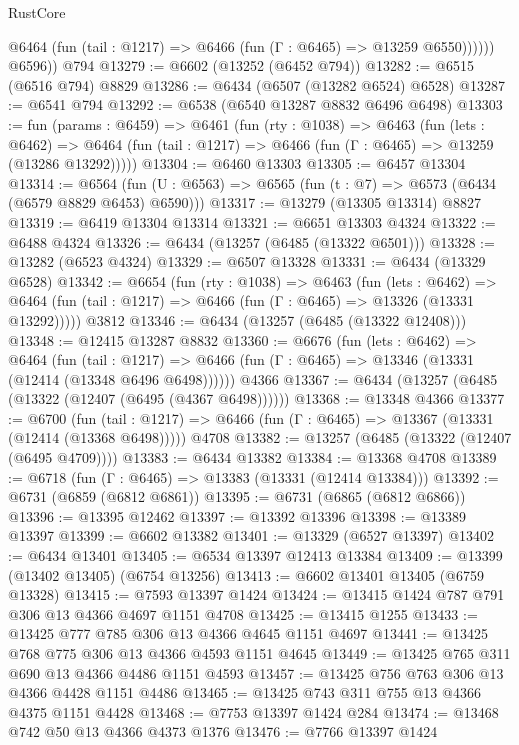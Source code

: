 \begin{lexlean}{RustCore}
\begin{coremodule}
              @6464 (fun (tail : @1217) => @6466 (fun (Γ : @6465) => @13259 @6550))))))
        @6596))
    @794
@13279 := @6602 (@13252 (@6452 @794))
@13282 := @6515 (@6516 @794) @8829
@13286 := @6434 (@6507 (@13282 @6524) @6528)
@13287 := @6541 @794
@13292 := @6538 (@6540 @13287 @8832 @6496 @6498)
@13303 := fun (params : @6459) =>
  @6461
    (fun (rty : @1038) =>
    @6463
      (fun (lets : @6462) =>
      @6464 (fun (tail : @1217) => @6466 (fun (Γ : @6465) => @13259 (@13286 @13292)))))
@13304 := @6460 @13303
@13305 := @6457 @13304
@13314 := @6564 (fun (U : @6563) => @6565 (fun (t : @7) => @6573 (@6434 (@6579 @8829 @6453) @6590)))
@13317 := @13279 (@13305 @13314) @8827
@13319 := @6419 @13304 @13314
@13321 := @6651 @13303 @4324
@13322 := @6488 @4324
@13326 := @6434 (@13257 (@6485 (@13322 @6501)))
@13328 := @13282 (@6523 @4324)
@13329 := @6507 @13328
@13331 := @6434 (@13329 @6528)
@13342 := @6654
    (fun (rty : @1038) =>
    @6463
      (fun (lets : @6462) =>
      @6464 (fun (tail : @1217) => @6466 (fun (Γ : @6465) => @13326 (@13331 @13292)))))
    @3812
@13346 := @6434 (@13257 (@6485 (@13322 @12408)))
@13348 := @12415 @13287 @8832
@13360 := @6676
    (fun (lets : @6462) =>
    @6464
      (fun (tail : @1217) =>
      @6466 (fun (Γ : @6465) => @13346 (@13331 (@12414 (@13348 @6496 @6498))))))
    @4366
@13367 := @6434 (@13257 (@6485 (@13322 (@12407 (@6495 (@4367 @6498))))))
@13368 := @13348 @4366
@13377 := @6700
    (fun (tail : @1217) => @6466 (fun (Γ : @6465) => @13367 (@13331 (@12414 (@13368 @6498)))))
    @4708
@13382 := @13257 (@6485 (@13322 (@12407 (@6495 @4709))))
@13383 := @6434 @13382
@13384 := @13368 @4708
@13389 := @6718 (fun (Γ : @6465) => @13383 (@13331 (@12414 @13384)))
@13392 := @6731 (@6859 (@6812 @6861))
@13395 := @6731 (@6865 (@6812 @6866))
@13396 := @13395 @12462
@13397 := @13392 @13396
@13398 := @13389 @13397
@13399 := @6602 @13382
@13401 := @13329 (@6527 @13397)
@13402 := @6434 @13401
@13405 := @6534 @13397 @12413 @13384
@13409 := @13399 (@13402 @13405) (@6754 @13256)
@13413 := @6602 @13401 @13405 (@6759 @13328)
@13415 := @7593 @13397 @1424
@13424 := @13415 @1424 @787 @791 @306 @13 @4366 @4697 @1151 @4708
@13425 := @13415 @1255
@13433 := @13425 @777 @785 @306 @13 @4366 @4645 @1151 @4697
@13441 := @13425 @768 @775 @306 @13 @4366 @4593 @1151 @4645
@13449 := @13425 @765 @311 @690 @13 @4366 @4486 @1151 @4593
@13457 := @13425 @756 @763 @306 @13 @4366 @4428 @1151 @4486
@13465 := @13425 @743 @311 @755 @13 @4366 @4375 @1151 @4428
@13468 := @7753 @13397 @1424 @284
@13474 := @13468 @742 @50 @13 @4366 @4373 @1376
@13476 := @7766 @13397 @1424

\end{coremodule}
\end{lexlean}

